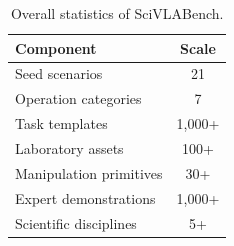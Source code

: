 \begin{table}[t]
  \centering
  \caption{Overall statistics of SciVLABench.}
  \label{tab:benchmark-statistics}
  \small
  \setlength{\tabcolsep}{5pt}
  \renewcommand{\arraystretch}{1.12}
  \begin{tabular}{p{3.2cm} c}
    \toprule
    \textbf{Component} & \textbf{Scale} \\
    \midrule
    Seed scenarios & 21 \\
    Operation categories & 7 \\
    Task templates & 1,000+ \\
    Laboratory assets & 100+ \\
    Manipulation primitives & 30+ \\
    Expert demonstrations & 1,000+ \\
    Scientific disciplines & 5+ \\
    \bottomrule
  \end{tabular}
\end{table}

